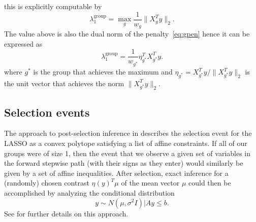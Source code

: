 \documentclass{imsart}
\begin{document}
this is explicitly computable by
\begin{equation}
\label{eq:lammax}
\lambda_1^{\text{group}} = \max_{g} \frac{1}{w_g}\|X_g^Ty\|_2 . 
\end{equation}
The value above is also the dual norm of the penalty~\eqref{eq:gpen}
hence it can be expressed as
\begin{equation}
\label{eq:lammax}
\lambda_1^{\text{group}}
 = \frac{1}{w_{g^*}}\eta_{g^*}^TX_{g^*}^Ty . 
\end{equation}
where $g^*$ is the group that achieves the maximum and 
$\eta_{g^*} = X_{g^*}^Ty / \|X_{g^*}^Ty\|_2$ is the unit vector that achieves the norm $\|X_{g^*}^Ty\|_2$.




\subsection{Selection events}

The approach to post-selection inference in \cite{lasso:fixed}
describes the selection event for the LASSO as a convex polytope
satisfying a list of affine constraints.
If all of our groups were of size 1, then
the event that we observe a given set of variables
in the forward stepwise path (with their signs as they enter) would similarly
be given by a set of affine inequalities.
After selection, exact inference for a (randomly) chosen contrast $\eta(y)^T\mu$ of the mean vector
$\mu$ could then be accomplished by analyzing the conditional distribution
\begin{equation}
y \sim N(\mu, \sigma^2 I) \bigl| Ay \leq b.
\end{equation}
See \cite{lasso:fixed,exact:lars} for further details on this approach.
\end{document}

